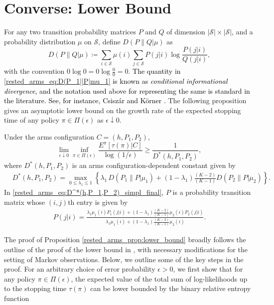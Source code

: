 \section{Converse: Lower Bound}\label{rested_arms_sec:lower_bound}
For any two transition probability matrices $P$ and $Q$ of dimension $|\mathcal{S}|\times |\mathcal{S}|$, and a probability distribution $\mu$ on $\mathcal{S}$, define $D(P\|Q|\mu)$ as
\begin{equation}
 	D(P\|Q|\mu)\coloneqq\sum\limits_{i\in\mathcal{S}}\mu(i)\sum\limits_{j\in\mathcal{S}}P(j|i)\log\frac{P(j|i)}{Q(j|i)},\label{rested_arms_eq:D(P_1||P|mu_1}
 \end{equation}
 with the convention $0\log 0=0\log\frac{0}{0}=0$. \textcolor{black}{The quantity in \eqref{rested_arms_eq:D(P_1||P|mu_1} is known as \emph{conditional informational divergence}, and the notation used above for representing the same is standard in the literature. See, for instance, Csisz\'{a}r and K\"{o}rner \cite[Eq. (2.4)]{csiszar2011information}.} The following proposition gives an asymptotic lower bound on {\color{black} the growth rate of} the expected stopping time of any policy $\pi\in\Pi(\epsilon)$ as $\epsilon\downarrow 0$.
\begin{prop}\label{rested_arms_prop:lower_bound}
 	Under the arms configuration $C=(h,P_1,P_2)$,
 	\begin{equation}
 		\lim\limits_{\epsilon\downarrow 0}\inf\limits_{\pi\in\Pi(\epsilon)}\frac{E^\pi[\tau(\pi)|C]}{\log ({1}/{\epsilon})}\geq \frac{1}{D^*(h,P_1,P_2)},\label{rested_arms_eq:lower_bound}
 	\end{equation}
 	where $D^*(h,P_1,P_2)$ is an arms configuration-dependent constant given by
 	\begingroup\allowdisplaybreaks\begin{align}
 		&D^*(h,P_1,P_2)=\max\limits_{0\leq\lambda_1\leq 1}\left\lbrace\lambda_1\,D(P_1\|P|\mu_1)+(1-\lambda_1)\frac{(K-2)}{(K-1)}D(P_2\|P|\mu_2)\right\rbrace.\label{rested_arms_eq:D^*(h,P_1,P_2)_simpl_final}
 \end{align}\endgroup
 In \eqref{rested_arms_eq:D^*(h,P_1,P_2)_simpl_final}, $P$ is a probability transition matrix whose $(i, j)$th entry is given by
 \begingroup\allowdisplaybreaks\begin{align}
 	P(j|i)=\frac{\lambda_1\mu_1(i)P_1(j|i)+(1-\lambda_1)\frac{(K-2)}{(K-1)}\mu_2(i)P_2(j|i)}{\lambda_1\mu_1(i)+(1-\lambda_1)\frac{(K-2)}{(K-1)}\mu_2(i)}.\label{rested_arms_eq:P(j|i)}
 \end{align}\endgroup
\end{prop}
The proof of Proposition \ref{rested_arms_prop:lower_bound} broadly follows the outline of the proof of the lower bound in \cite{kaufmann2016complexity}, with necessary modifications for the setting of Markov observations. Below, we outline some of the key steps in the proof. For an arbitrary choice of error probability $\epsilon>0$, we first show that for any policy $\pi\in\Pi(\epsilon)$,  the expected value of the total sum of log-likelihoods up to the stopping time $\tau(\pi)$ can be lower bounded by the binary relative entropy function
